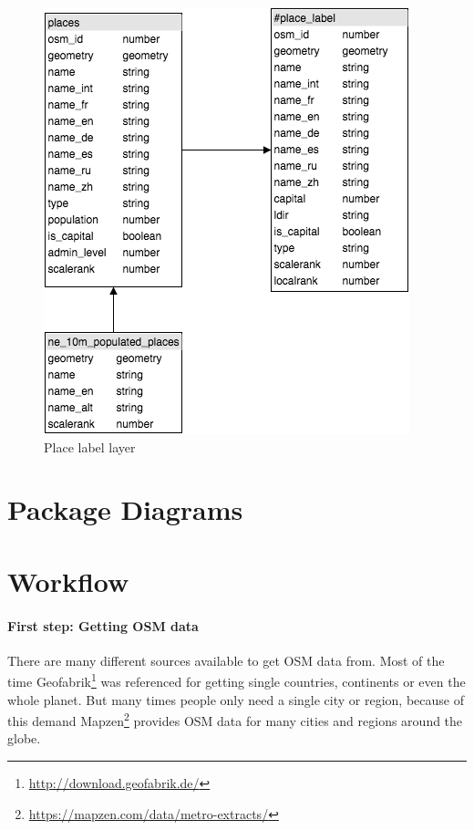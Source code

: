 \begin{figure}[h]
  \includegraphics[scale=0.6]{images/place_layer.png}
  \caption{Place label layer}
\end{figure}




\section{Package Diagrams}


\section{Workflow}\label{workflow}

\paragraph{First step: Getting OSM
data}\label{first-step-getting-osm-data}

There are many different sources available to get OSM data from. Most of
the time Geofabrik\footnote{\url{http://download.geofabrik.de/}} was
referenced for getting single countries, continents or even the whole
planet. But many times people only need a single city or region, because
of this demand
Mapzen\footnote{\url{https://mapzen.com/data/metro-extracts/}} provides
OSM data for many cities and regions around the globe.

